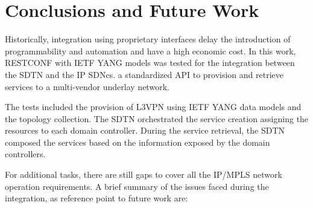\documentclass[10pt, conference]{IEEEtran}
\begin{document}
\section{Conclusions and Future Work}
\label{section:conclusions}

 Historically, integration using proprietary interfaces delay the introduction of programmability and automation and have a high economic cost. In this work, RESTCONF with IETF YANG models was tested for the integration between the SDTN  and the IP SDNcs.  a standardized  API to provision and retrieve services to a multi-vendor underlay network. 

The tests included the provision of L3VPN using IETF YANG data models and the topology collection. The SDTN  orchestrated the service creation assigning the resources to each domain controller. During the service retrieval, the SDTN  composed the services based on the information exposed by the domain controllers.

For additional tasks, there are still gaps to cover all the IP/MPLS network operation requirements. A brief summary of the issues faced during the integration, as reference point to future work are: 
\end{document}
